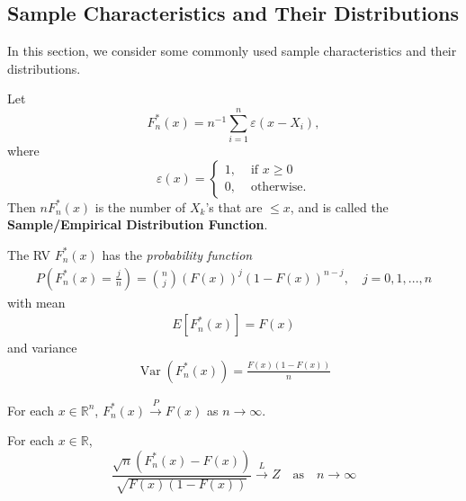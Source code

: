 \documentclass{tufte-handout}
\DeclareMathOperator{\var}{Var}
\begin{document}
\subsection{Sample Characteristics and Their Distributions}%
  \label{sub:Sample Characteristics and Their Distributions}
 In this section, we consider some commonly used sample characteristics and their distributions. 
\begin{definition}
  Let $$F^*_n(x) = n^{-1} \sum^{n}_{i=1} \varepsilon (x -X_i),  $$
  where 
  $$\varepsilon(x) = 
  \begin{cases}
    1, &\text{ if } x \geq 0\\
    0, &\text{ otherwise.} 
  \end{cases} $$Then $n F^*_n(x)$ is the number of $X_k$'s that are $\leq x$, and is called the \textbf{Sample/Empirical Distribution Function}. 
\end{definition}
\begin{theorem} \label{label}
  The RV $F^*_n (x)$ has the \textit{probability function}
  \begin{equation*}
    \begin{split}
      P \left( F^*_n(x) = \frac{j}{n}  \right) ={n \choose j} (F(x))^j (1 - F(x))^{n-j}, \quad j = 0,1,..., n
    \end{split}
  \end{equation*}
  with mean 
  \begin{equation*}
    \begin{split}
      E[F^*_n (x)] = F(x)
    \end{split}
  \end{equation*}
  and variance 
  \begin{equation*}
    \begin{split}
      \var(F^*_n (x)) = \frac{F(x) (1- F(x))}{n} 
    \end{split}
  \end{equation*}
\end{theorem}
\begin{corollary}
  For each $x \in \mathbb{R}^n$, $F^*_n(x)\overset{P}{\to} F(x)$ as $n \to \infty$.
\end{corollary}
\begin{corollary}
  For each $x \in \mathbb{R}$, 
  $$\frac{\sqrt{n} (F^*_n(x) - F(x))}{\sqrt{F(x)(1-F(x))} }\overset{L}{\to} Z \quad \text{as} \quad n\to \infty $$  
\end{corollary}
\end{document}
